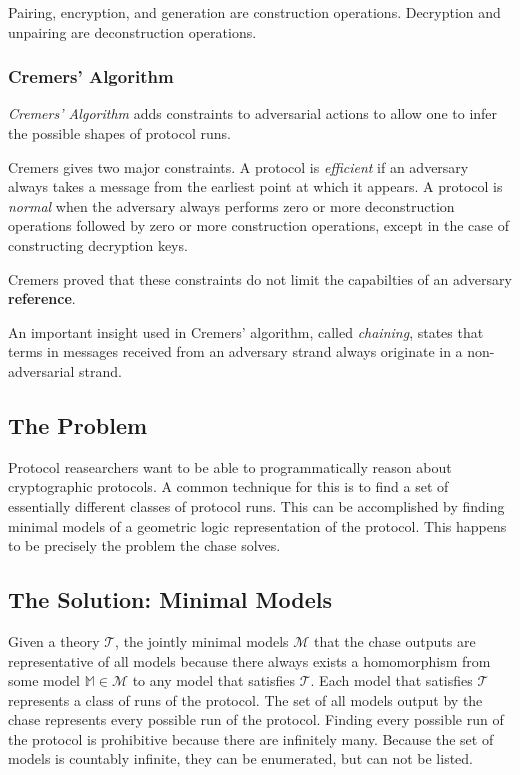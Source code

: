 			Pairing, encryption, and generation are construction operations.
			Decryption and unpairing are deconstruction operations.

		\subsubsection{Cremers' Algorithm}

			\emph{Cremers' Algorithm} adds constraints to adversarial actions
			to allow one to infer the possible shapes of protocol runs.

			Cremers gives two major constraints. A protocol is \emph{efficient}
			if an adversary always takes a message from the earliest point at
			which it appears. A protocol is \emph{normal} when the adversary
			always performs zero or more deconstruction operations followed by
			zero or more construction operations, except in the case of
			constructing decryption keys.

			Cremers proved that these constraints do not limit the capabilties
			of an adversary \textbf{reference}.

			An important insight used in Cremers' algorithm, called
			\emph{chaining}, states that terms in messages received from an
			adversary strand always originate in a non-adversarial strand.

	\subsection{The Problem}

		Protocol reasearchers want to be able to programmatically reason about
		cryptographic protocols. A common technique for this is to find a set of
		essentially different classes of protocol runs. This can be accomplished by
		finding minimal models of a geometric logic representation of the protocol.
		This happens to be precisely the problem the chase solves.

	\subsection{The Solution: Minimal Models}

		Given a theory $\mathcal{T}$, the jointly minimal models $\mathcal{M}$
		that the chase outputs are representative of all models because there
		always exists a homomorphism from some model $\mathbb{M} \in
		\mathcal{M}$ to any model that satisfies $\mathcal{T}$. Each model that
		satisfies $\mathcal{T}$ represents a class of runs of the protocol. The
		set of all models output by the chase represents every possible run of
		the protocol. Finding every possible run of the protocol is prohibitive
		because there are infinitely many. Because the set of models is
		countably infinite, they can be enumerated, but can not be listed.

